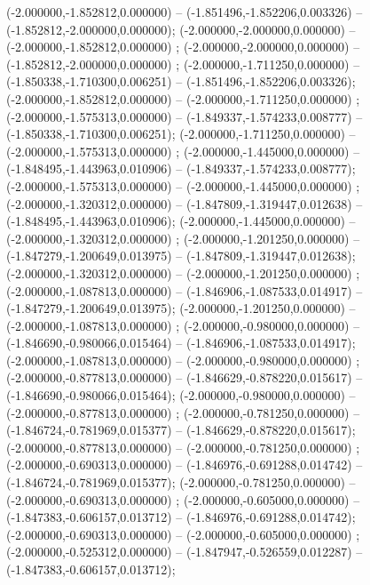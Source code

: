  (-2.000000,-1.852812,0.000000) -- (-1.851496,-1.852206,0.003326) -- (-1.852812,-2.000000,0.000000);
 (-2.000000,-2.000000,0.000000) -- (-2.000000,-1.852812,0.000000) ;
 (-2.000000,-2.000000,0.000000) -- (-1.852812,-2.000000,0.000000) ;
 (-2.000000,-1.711250,0.000000) -- (-1.850338,-1.710300,0.006251) -- (-1.851496,-1.852206,0.003326);
 (-2.000000,-1.852812,0.000000) -- (-2.000000,-1.711250,0.000000) ;
 (-2.000000,-1.575313,0.000000) -- (-1.849337,-1.574233,0.008777) -- (-1.850338,-1.710300,0.006251);
 (-2.000000,-1.711250,0.000000) -- (-2.000000,-1.575313,0.000000) ;
 (-2.000000,-1.445000,0.000000) -- (-1.848495,-1.443963,0.010906) -- (-1.849337,-1.574233,0.008777);
 (-2.000000,-1.575313,0.000000) -- (-2.000000,-1.445000,0.000000) ;
 (-2.000000,-1.320312,0.000000) -- (-1.847809,-1.319447,0.012638) -- (-1.848495,-1.443963,0.010906);
 (-2.000000,-1.445000,0.000000) -- (-2.000000,-1.320312,0.000000) ;
 (-2.000000,-1.201250,0.000000) -- (-1.847279,-1.200649,0.013975) -- (-1.847809,-1.319447,0.012638);
 (-2.000000,-1.320312,0.000000) -- (-2.000000,-1.201250,0.000000) ;
 (-2.000000,-1.087813,0.000000) -- (-1.846906,-1.087533,0.014917) -- (-1.847279,-1.200649,0.013975);
 (-2.000000,-1.201250,0.000000) -- (-2.000000,-1.087813,0.000000) ;
 (-2.000000,-0.980000,0.000000) -- (-1.846690,-0.980066,0.015464) -- (-1.846906,-1.087533,0.014917);
 (-2.000000,-1.087813,0.000000) -- (-2.000000,-0.980000,0.000000) ;
 (-2.000000,-0.877813,0.000000) -- (-1.846629,-0.878220,0.015617) -- (-1.846690,-0.980066,0.015464);
 (-2.000000,-0.980000,0.000000) -- (-2.000000,-0.877813,0.000000) ;
 (-2.000000,-0.781250,0.000000) -- (-1.846724,-0.781969,0.015377) -- (-1.846629,-0.878220,0.015617);
 (-2.000000,-0.877813,0.000000) -- (-2.000000,-0.781250,0.000000) ;
 (-2.000000,-0.690313,0.000000) -- (-1.846976,-0.691288,0.014742) -- (-1.846724,-0.781969,0.015377);
 (-2.000000,-0.781250,0.000000) -- (-2.000000,-0.690313,0.000000) ;
 (-2.000000,-0.605000,0.000000) -- (-1.847383,-0.606157,0.013712) -- (-1.846976,-0.691288,0.014742);
 (-2.000000,-0.690313,0.000000) -- (-2.000000,-0.605000,0.000000) ;
 (-2.000000,-0.525312,0.000000) -- (-1.847947,-0.526559,0.012287) -- (-1.847383,-0.606157,0.013712);
